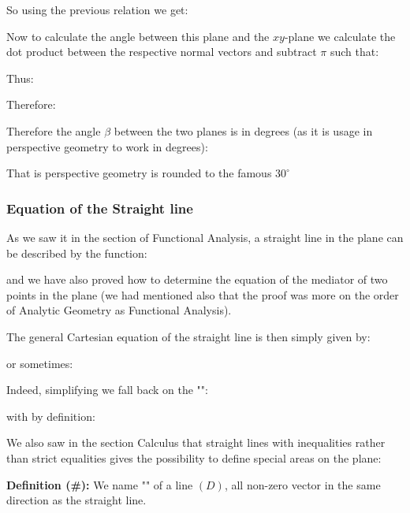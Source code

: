 	So using the previous relation we get:
	
	Now to calculate the angle between this plane and the $xy$-plane we calculate the dot product between the respective normal vectors and subtract $\pi$ such that:
	
	Thus:
	
	 Therefore:
	
	 Therefore the angle $\beta$ between the two planes is in degrees (as it is usage in perspective geometry to work in degrees):
	 
	 That is perspective geometry is rounded to the famous $30^\circ$
	
	\pagebreak	
	\subsubsection{Equation of the Straight line}
	As we saw it in the section of Functional Analysis, a straight line in the plane can be described by the function:
	
	and we have also proved how to determine the equation of the mediator of two points in the plane (we had mentioned also that the proof was more on the order of Analytic Geometry as Functional Analysis).
	
	The general Cartesian equation of the straight line is then simply given by:
	
	or sometimes:
	
	Indeed, simplifying we fall back on the "":
	
	with by definition:
	
	We also saw in the section Calculus that straight lines with inequalities rather than strict equalities gives the possibility to define special areas on the plane:
	\begin{center}
	\end{center}
	\textbf{Definition (\#\mydef):} We name "" of a line $(D)$, all non-zero vector in the same direction as the straight line.
	
